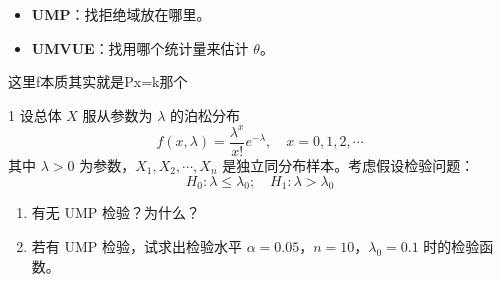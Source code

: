\begin{dxtips}
    \begin{itemize}
    \item \textbf{UMP}：找拒绝域放在哪里。
    \item \textbf{UMVUE}：找用哪个统计量来估计 $\theta$。
\end{itemize}
\end{dxtips}
\begin{dxtips}
    这里f本质其实就是Px=k那个
\end{dxtips}
\begin{homework}{1}
设总体 $X$ 服从参数为 $\lambda$ 的泊松分布
$$f(x,\lambda) = \frac{\lambda^x}{x!}e^{-\lambda}, \quad x = 0,1,2,\cdots$$
其中 $\lambda > 0$ 为参数，$X_1, X_2, \cdots, X_n$ 是独立同分布样本。考虑假设检验问题：
$$H_0: \lambda \leq \lambda_0; \quad H_1: \lambda > \lambda_0$$
\begin{enumerate}
    \item 有无 UMP 检验？为什么？
    \item 若有 UMP 检验，试求出检验水平 $\alpha = 0.05$，$n = 10$，$\lambda_0 = 0.1$ 时的检验函数。
\end{enumerate}
\end{homework}
